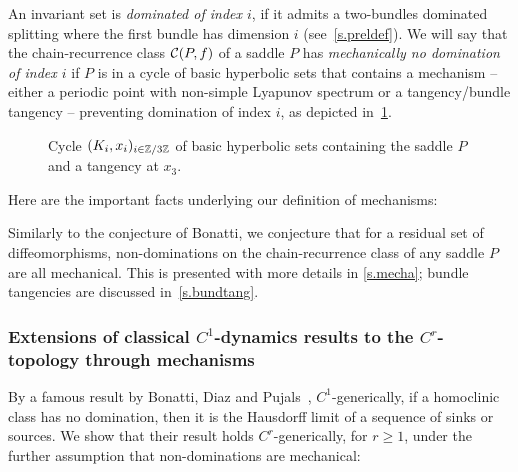 \documentclass[11pt, a4paper]{amsart}
\theoremstyle{plain}
\theoremstyle{definition}
\theoremstyle{remark}
\numberwithin{equation}{section}         %
\begin{document}
An invariant set is {\em dominated of index $i$}, if it admits a two-bundles dominated splitting where the first bundle has dimension $i$ (see~\cref{s.preldef}). 
We will say that the chain-recurrence class ${\mathcal C}(P,f)$ of a saddle $P$ has {\em mechanically no domination of index $i$} if $P$ is in a cycle of basic hyperbolic sets that contains a mechanism -- either a periodic point with non-simple Lyapunov spectrum or a tangency/bundle tangency -- preventing domination of index $i$, as depicted in~\cref{f.cyclemech}. 
\begin{figure}%
\begin{center}
\def\svgwidth{130pt}           %

\end{center}
\caption{\small Cycle $(K_i,x_i)_{i\in {\mathbb Z}/3{\mathbb Z}}$ of basic hyperbolic sets containing the saddle $P$ and a tangency at $x_3$.}
\label{f.cyclemech}
\end{figure} 
Here are the important facts underlying our definition of mechanisms:
\medskip


\medskip
Similarly to the conjecture of Bonatti, we conjecture that for a residual set of diffeomorphisms, non-dominations on the chain-recurrence class of any saddle $P$ are all mechanical. 
 This is presented with more details in \cref{s.mecha}; bundle tangencies are discussed in~\cref{s.bundtang}. 


\subsubsection{Extensions of classical $C^1$-dynamics results to the $C^r$-topology through mechanisms}

By a famous result by Bonatti, Diaz and Pujals~\cite{BDP}, $C^1$-generically, if a homoclinic class has no domination, then it is the Hausdorff limit of a sequence of sinks or sources. 
We show that their result holds $C^r$-generically, for $r\geq 1$, under the further assumption that non-dominations are mechanical:
\medskip
\end{document}
